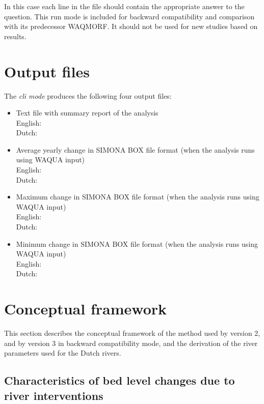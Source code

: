 In this case each line in the file  should contain the appropriate answer to the question.
This run mode is included for backward compatibility and comparison with its predecessor WAQMORF.
It should not be used for new studies based on \dflowfm results.

\section{Output files}

The \emph{cli mode} produces the following four output files:

\begin{itemize}
\item Text file with summary report of the analysis \\
English:  \\
Dutch: 
\item Average yearly change in SIMONA BOX file format (when the analysis runs using WAQUA input) \\
English:  \\
Dutch: 
\item Maximum change in SIMONA BOX file format (when the analysis runs using WAQUA input) \\
English:  \\
Dutch: 
\item Minimum change in SIMONA BOX file format (when the analysis runs using WAQUA input) \\
English:  \\
Dutch: 
\end{itemize}

\section{Conceptual framework}

This section describes the conceptual framework of the method used by \dfastmi version 2, and by version 3 in backward compatibility mode, and the derivation of the river parameters used for the Dutch rivers.

\subsection{Characteristics of bed level changes due to river interventions}


